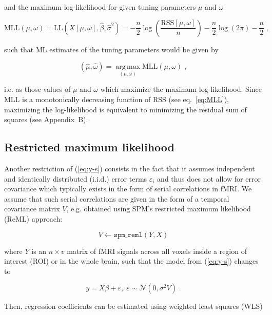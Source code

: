 \documentclass[a4paper,12pt]{article}
\begin{document}
and the maximum log-likelihood for given tuning parameters $\mu$ and $\omega$

\begin{equation} \label{eq:MLL}
\mathrm{MLL}(\mu,\omega) = \mathrm{LL}(X[\mu,\omega],\hat{\beta},\hat{\sigma}^2) = - \frac{n}{2} \log\left( \frac{\mathrm{RSS}\left[ \mu, \omega \right]}{n} \right) - \frac{n}{2} \log(2\pi) - \frac{n}{2} \; ,
\end{equation}

such that ML estimates of the tuning parameters would be given by

\begin{equation} \label{eq:mu-tw-est-ML}
(\hat{\mu},\hat{\omega}) = \operatorname*{arg\,max}_{(\mu,\omega)} \mathrm{MLL}(\mu,\omega) \; ,
\end{equation}

i.e. as those values of $\mu$ and $\omega$ which maximize the maximum log-likelihood. Since MLL is a monotonically decreasing function of RSS (see eq.~\ref{eq:MLL}), maximizing the log-likelihood is equivalent to minimizing the residual sum of squares (see Appendix~B).


\subsection{Restricted maximum likelihood}

Another restriction of (\ref{eq:y-s}) consists in the fact that it assumes independent and identically distributed (i.i.d.) error terms $\varepsilon_i$ and thus does not allow for error covariance which typically exists in the form of serial correlations in fMRI. We assume that such serial correlations are given in the form of a temporal covariance matrix $V$, e.g. obtained using SPM's restricted maximum likelihood (ReML) approach:

\begin{equation} \label{eq:ReML}
V \leftarrow \mathtt{spm\_reml}(Y, X)
\end{equation}

where $Y$ is an $n \times v$ matrix of fMRI signals across all voxels inside a region of interest (ROI) or in the whole brain, such that the model from (\ref{eq:y-s}) changes to

\begin{equation} \label{eq:y-X-V}
y = X \beta + \varepsilon, \; \varepsilon \sim \mathcal{N}(0, \sigma^2 V) \; .
\end{equation}

Then, regression coefficients can be estimated using weighted least squares (WLS)
\end{document}
